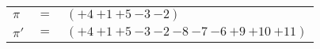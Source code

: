 \begin{example}\label{example:TCTQPMWV}
  \hfill
  \begin{\position}
    \begin{tabular}{lll}
      $\pi$  & $=$ & $({+4}~{+1}~{+5}~{-3}~{-2})$ \\
      $\pi'$ & $=$ & $({+4}~{+1}~{+5}~{-3}~{-2}~{-8}~{-7}~{-6}~{+9}~{+10}~{+11})$ \\
    \end{tabular}
  \end{\position}
\end{example}
